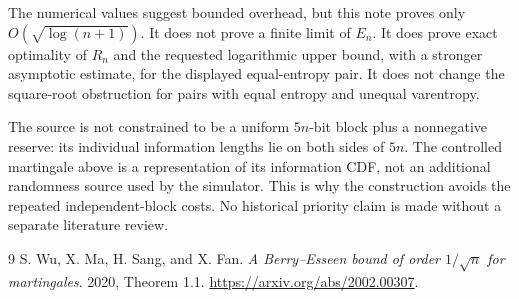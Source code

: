 \documentclass[11pt,a4paper]{article}
\begin{document}
The numerical values suggest bounded overhead, but this note proves only
$O(\sqrt{\log(n+1)})$. It does not prove a finite limit of $E_n$.
It does prove exact optimality of $R_n$ and the requested logarithmic upper
bound, with a stronger asymptotic estimate, for the displayed equal-entropy
pair. It does not change the square-root obstruction for pairs with equal
entropy and unequal varentropy.

The source is not constrained to be a uniform $5n$-bit block plus a
nonnegative reserve: its individual information lengths lie on both sides
of $5n$. The controlled martingale above is a representation of its
information CDF, not an additional randomness source used by the simulator.
This is why the construction avoids the repeated independent-block costs.
No historical priority claim is made without a separate literature review.

\begin{thebibliography}{9}
S. Wu, X. Ma, H. Sang, and X. Fan.
\emph{A Berry--Esseen bound of order $1/\sqrt n$ for martingales}.
2020, Theorem 1.1.
\url{https://arxiv.org/abs/2002.00307}.
\end{thebibliography}
\end{document}
